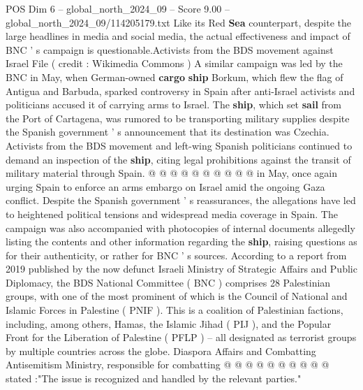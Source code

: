 \begin{textsample}{POS Dim 6 – global\_north\_2024\_09 – Score 9.00 – global\_north\_2024\_09/114205179.txt}
Like its Red \textbf{Sea} counterpart, despite the large headlines in media and social media, the actual effectiveness and impact of BNC ' s campaign is questionable.Activists from the BDS movement against Israel File ( credit : Wikimedia Commons ) A similar campaign was led by the BNC in May, when German-owned \textbf{cargo} \textbf{ship} Borkum, which flew the flag of Antigua and Barbuda, sparked controversy in Spain after anti-Israel activists and politicians accused it of carrying arms to Israel.
The \textbf{ship}, which set \textbf{sail} from the Port of Cartagena, was rumored to be transporting military supplies despite the Spanish government ' s announcement that its destination was Czechia.
Activists from the BDS movement and left-wing Spanish politicians continued to demand an inspection of the \textbf{ship}, citing legal prohibitions against the transit of military material through Spain. @ @ @ @ @ @ @ @ @ @ in May, once again urging Spain to enforce an arms embargo on Israel amid the ongoing Gaza conflict.
Despite the Spanish government ' s reassurances, the allegations have led to heightened political tensions and widespread media coverage in Spain.
The campaign was also accompanied with photocopies of internal documents allegedly listing the contents and other information regarding the \textbf{ship}, raising questions as for their authenticity, or rather for BNC ' s sources.
According to a report from 2019 published by the now defunct Israeli Ministry of Strategic Affairs and Public Diplomacy, the BDS National Committee ( BNC ) comprises 28 Palestinian groups, with one of the most prominent of which is the Council of National and Islamic Forces in Palestine ( PNIF ).
This is a coalition of Palestinian factions, including, among others, Hamas, the Islamic Jihad ( PIJ ), and the Popular Front for the Liberation of Palestine ( PFLP ) -- all designated as terrorist groups by multiple countries across the globe.
Diaspora Affairs and Combatting Antisemitism Ministry, responsible for combatting @ @ @ @ @ @ @ @ @ @ stated :"The issue is recognized and handled by the relevant parties."

\end{textsample}
